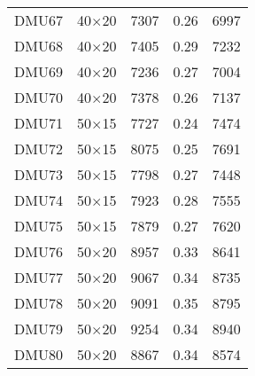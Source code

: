 \begin{table}[H]
\begin{tabular}{@{}ccccc@{}}
DMU67 & 40$\times$20 & 7307 & 0.26 & 6997\\ 
DMU68 & 40$\times$20 & 7405 & 0.29 & 7232\\ 
DMU69 & 40$\times$20 & 7236 & 0.27 & 7004\\ 
DMU70 & 40$\times$20 & 7378 & 0.26 & 7137\\ 
DMU71 & 50$\times$15 & 7727 & 0.24 & 7474\\ 
DMU72 & 50$\times$15 & 8075 & 0.25 & 7691\\ 
DMU73 & 50$\times$15 & 7798 & 0.27 & 7448\\ 
DMU74 & 50$\times$15 & 7923 & 0.28 & 7555\\ 
DMU75 & 50$\times$15 & 7879 & 0.27 & 7620\\ 
DMU76 & 50$\times$20 & 8957 & 0.33 & 8641\\ 
DMU77 & 50$\times$20 & 9067 & 0.34 & 8735\\ 
DMU78 & 50$\times$20 & 9091 & 0.35 & 8795\\ 
DMU79 & 50$\times$20 & 9254 & 0.34 & 8940\\ 
DMU80 & 50$\times$20 & 8867 & 0.34 & 8574\\ \bottomrule
\end{tabular}
\end{table}
